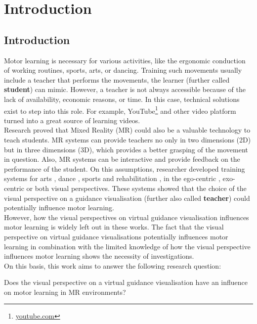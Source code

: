 \chapter{Introduction}

\section{Introduction}

Motor learning is necessary for various activities, like the ergonomic conduction of working routines, sports, arts, or dancing. Training such movements usually include a teacher that performs the movements, the learner (further called \textbf{student}) can mimic. However, a teacher is not always accessible because of the lack of availability, economic reasons, or time. In this case, technical solutions exist to step into this role. For example, YouTube\footnote{\href{https://www.youtube.com/}{youtube.com}} and other video platform turned into a great source of learning videos.\\
Research proved that Mixed Reality (MR) could also be a valuable technology to teach students. MR systems can provide teachers no only in two dimensions (2D) but in three dimensions (3D), which provides a better grasping of the movement in question. Also, MR systems can be interactive and provide feedback on the performance of the student. On this assumptions, researcher developed training systems for arts \cite{Han2016, Komura2006, Chua}, dance \cite{Yan2015, Chan2010, Hachimura2004}, sports \cite{Covaci2014, Kojima2014} and rehabilitation \cite{Chinthammit2014, Tang2015, Rajanna2015}, in the ego-centric \cite{Yang2002, Katzakis2017, Scavo2015}, exo-centric \cite{Han2017, Velloso2013, Lieberman2007} or both \cite{Sousa2016, Hoang2016, Sodhi2012} visual perspectives. These systems showed that the choice of the visual perspective on a guidance visualisation (further also called \textbf{teacher}) could potentially influence motor learning.\\
However, how the visual perspectives on virtual guidance visualisation influences motor learning is widely left out in these works. The fact that the visual perspective on virtual guidance visualisations potentially influences motor learning in combination with the limited knowledge of how the visual perspective influences motor learning shows the necessity of investigations.\\
On this basis, this work aims to answer the following research question:
\begin{tcolorbox}[colback=red!30!white]
	Does the visual perspective on a virtual guidance visualisation have an influence on motor learning in MR environments?
\end{tcolorbox}
